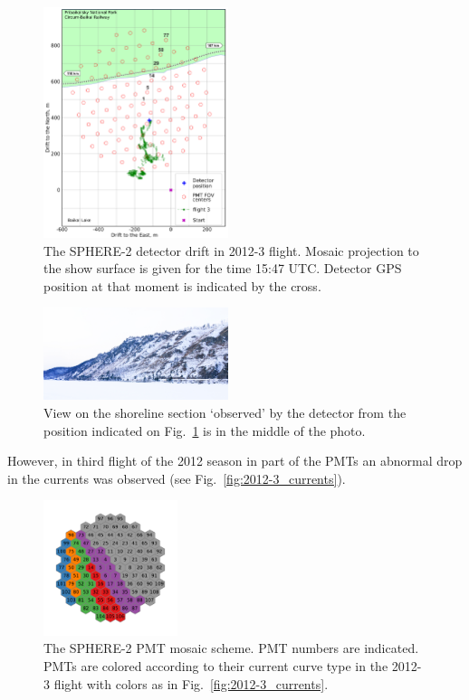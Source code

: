 \documentclass[final,5p,times,twocolumn]{elsarticle}
\begin{document}
\begin{figure}[tb]
    \includegraphics[width=0.48\textwidth]{2012_drift-mod.pdf}
    \caption{The SPHERE-2 detector drift in 2012-3 flight. Mosaic projection to the show surface is given for the time 15:47 UTC. Detector GPS position at that moment is indicated by the cross.}
    \label{fig:2012-drift}
\end{figure}

\begin{figure}[tb]
    \includegraphics[width=0.48\textwidth]{DSC_7256_1.jpg}
    \caption{View on the shoreline section `observed' by the detector from the position indicated on Fig.~\ref{fig:2012-drift} is in the middle of the photo.}
    \label{fig:2012--shore-view}
\end{figure}


However, in third flight of the 2012 season in part of the PMTs an abnormal drop in the currents was observed (see Fig.~\ref{fig:2012-3_currents}).

\begin{figure}[tb]
\centering
    \includegraphics[width=0.35\textwidth]{2012-3_retina_all.pdf}
    \caption{The SPHERE-2 PMT mosaic scheme. PMT numbers are indicated. PMTs are colored according to their current curve type in the 2012-3 flight with colors as in Fig.~\ref{fig:2012-3_currents}.}
    \label{fig:2012-3_shore_image}
\end{figure}
\end{document}
